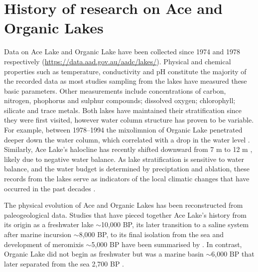 \section{History of research on Ace and Organic Lakes}
Data on Ace Lake and Organic Lake have been collected since 1974 and 1978 respectively 
(\url{https://data.aad.gov.au/aadc/lakes/}).
Physical and chemical properties such as temperature, conductivity and pH constitute the majority of the recorded data as most studies sampling from the lakes have measured these basic parameters.
Other measurements include concentrations of carbon, nitrogen, phophorus and sulphur compounds; dissolved oxygen; chlorophyll; silicate and trace metals.
Both lakes have maintained their stratification since they were first visited, however water column structure has proven to be variable.
For example, between 1978--1994 the mixolimnion of Organic Lake penetrated deeper down the water column, which correlated with a drop in the water level \cite{Gibson1995, Gibson1996}.
Similarly, Ace Lake's halocline has recently shifted downward from 7 m \cite{Rankin1999} to 12 m \cite{Lauro2011}, likely due to negative water balance.
As lake stratification is sensitive to water balance, and the water budget is determined by preciptation and ablation, these records from the lakes serve as indicators of the local climatic changes that have occurred in the past decades \cite{Gibson1995}.


The physical evolution of Ace and Organic Lakes has been reconstructed from paleogeological data.
Studies that have pieced together Ace Lake's history from its origin as a freshwater lake $\sim$10,000 BP, its later transition to a saline system after marine incursion $\sim$8,000 BP, to its final isolation from the sea and development of meromixis $\sim$5,000 BP have been summarised by \citet{Rankin1999}.
In contrast, Organic Lake did not begin as freshwater but was a marine basin $\sim$6,000 BP that later separated from the sea 2,700 BP \cite{Bird1991, Zwartz1998}.

